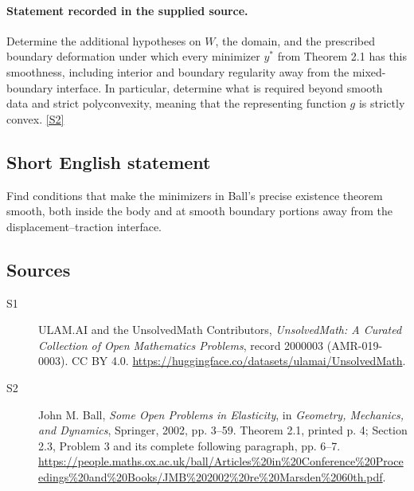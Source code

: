 \documentclass[11pt]{book}
\newcommand{\sref}[2]{\hyperlink{source:#1:#2}{[S#2]}}
\begin{document}
\paragraph{Statement recorded in the supplied source.}
Determine the additional hypotheses on $W$, the domain, and the prescribed boundary deformation under which every minimizer $y^*$ from Theorem 2.1 has this smoothness, including interior and boundary regularity away from the mixed-boundary interface. In particular, determine what is required beyond smooth data and strict polyconvexity, meaning that the representing function $g$ is strictly convex. \sref{2000003}{2}
\subsection{Short English statement}
Find conditions that make the minimizers in Ball’s precise existence theorem smooth, both inside the body and at smooth boundary portions away from the displacement--traction interface.
\subsection{Sources}
\begin{description}
\item[\hypertarget{source:2000003:1}{S1}] ULAM.AI and the UnsolvedMath Contributors, \emph{UnsolvedMath: A Curated Collection of Open Mathematics Problems}, record 2000003 (AMR-019-0003). CC BY 4.0. \url{https://huggingface.co/datasets/ulamai/UnsolvedMath}.
\item[\hypertarget{source:2000003:2}{S2}] John M. Ball, \emph{Some Open Problems in Elasticity}, in \emph{Geometry, Mechanics, and Dynamics}, Springer, 2002, pp. 3--59. Theorem 2.1, printed p. 4; Section 2.3, Problem 3 and its complete following paragraph, pp. 6--7. \url{https://people.maths.ox.ac.uk/ball/Articles%20in%20Conference%20Proceedings%20and%20Books/JMB%202002%20re%20Marsden%2060th.pdf}.
\end{description}
\label{end:2000003}
\end{document}
